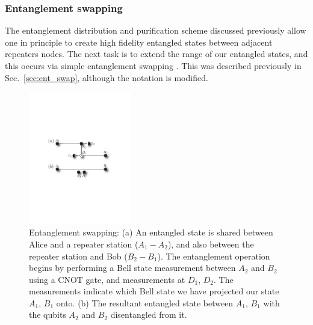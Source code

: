 \documentclass[twocolumn, aps, rmp, amsmath, amssymb, nofootinbib, superscriptaddress, longbibliography, floatfix, table-of-contents, eqsecnum]{revtex4-1}
\begin{document}
\subsubsection{Entanglement swapping}\label{sec:reps_ent_swap}

The entanglement distribution and purification scheme discussed previously allow one in principle to create high fidelity entangled states between adjacent repeaters nodes. The next task is to extend the range of our entangled states, and this occurs via simple entanglement swapping \cite{bib:BDCZ98, bib:Zukowski93, bib:goebel08, bib:duan01}. This was described previously in Sec.~\ref{sec:ent_swap}, although the notation is modified.

\begin{figure}[!htb]
\includegraphics[width=0.4\textwidth]{repeaters_6}
\caption{Entanglement swapping: (a) An entangled state is shared between Alice and a repeater station ($A_1-A_2$), and also between the repeater station and Bob ($B_2-B_1$). The entanglement operation begins by performing a Bell state measurement between $A_2$ and $B_2$ using a CNOT gate, and measurements at $D_1$, $D_2$.  The measurements indicate which Bell state we have projected our state $A_1$, $B_1$ onto. (b) The resultant entangled state between $A_1$, $B_1$ with the qubits $A_2$ and $B_2$ disentangled from it.}
\label{fig:repeaters_6}
\end{figure} 
\end{document}
